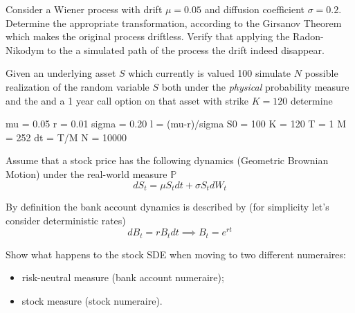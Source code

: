 \documentclass[12pt,a4paper]{book}
\begin{document}
\begin{exercise}
Consider a Wiener process with drift $\mu=0.05$ and diffusion coefficient $\sigma=0.2$. Determine the appropriate transformation, according to the Girsanov Theorem which makes the original process driftless. Verify that applying the Radon-Nikodym to the a simulated path of the process the drift indeed disappear.

\end{exercise}

\begin{exercise}
Given an underlying asset $S$ which currently is valued 100 simulate $N$ possible realization of the random variable $S$ both under the \emph{physical} probability measure and the and a 1 year call option on that asset with strike $K=120$ determine 


mu = 0.05
r = 0.01
sigma = 0.20
l = (mu-r)/sigma
S0 = 100
K = 120
T = 1
M = 252
dt = T/M
N = 10000
\end{exercise}

\begin{exercise}[subtitle=Moving Away from $\mathbb{P}$ Measure]
Assume that a stock price has the following dynamics (Geometric Brownian Motion) under the real-world measure $\mathbb{P}$
\begin{equation*}
dS_t = \mu S_t dt + \sigma S_t dW_t
\end{equation*}

By definition the bank account dynamics is described by (for simplicity let's consider deterministic rates)
\begin{equation*}
dB_t = rB_tdt\implies B_t = e^{rt}
\end{equation*}

Show what happens to the stock SDE when moving to two different numeraires:
\begin{itemize}
\item risk-neutral measure (bank account numeraire);
\item stock measure (stock numeraire).
\end{itemize}
\end{exercise}
\end{document}
